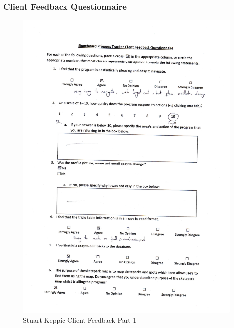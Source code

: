 \begin{itemize}
\subsubsection{Client Feedback Questionnaire} %


\begin{figure}[H]
    \includegraphics[width=\textwidth]{./Evaluation/images/StuFeedback1.pdf}
    \caption{Stuart Keppie Client Feedback Part 1} \label{fig:StuFeedback1}
\end{figure}


\end{itemize}
